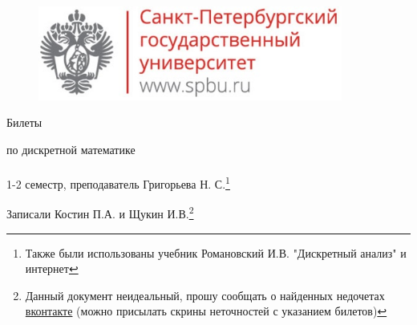 \documentclass[main]{subfiles}
\begin{document}
	\begin{figure}[H]
			\includegraphics[width=10cm]{../../../template/spsu.jpg}
			\centering
	\end{figure}
	\vspace*{\fill}
	\begin{center}
		\huge Билеты

		\huge по дискретной математике\\ \ \\
		\Large 1-2 семестр, преподаватель Григорьева Н. С.\footnote{Также были использованы учебник Романовский И.В. "Дискретный анализ"{} и интернет}

		\large Записали Костин П.А. и Щукин И.В.\footnote{Данный документ неидеальный, прошу сообщать о найденных недочетах \href{https://vk.com/drab_existence_a}{вконтакте} (можно присылать скрины неточностей с указанием билетов)}
	\end{center}
	\vspace*{\fill}
	\vspace*{\fill}

	\newpage
	\tableofcontents
	\newpage
\end{document}
